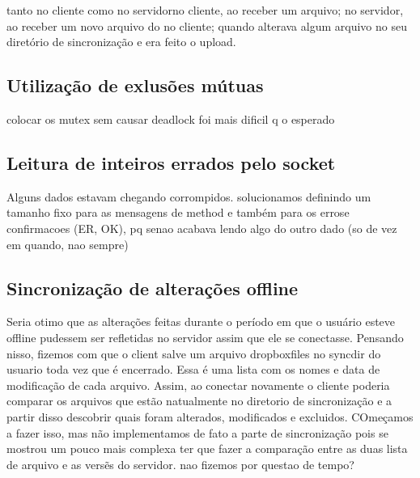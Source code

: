 \documentclass[a4paper]{article}
\begin{document}
tanto no cliente como no servidorno cliente, ao receber um arquivo; no servidor, ao receber um novo arquivo do  no cliente; quando alterava algum arquivo no seu diretório de sincronização e era feito o upload.
\subsection{Utilização de exlusões mútuas}
colocar os mutex sem causar deadlock foi mais dificil q o esperado

\subsection{Leitura de inteiros errados pelo socket}
Alguns dados estavam chegando corrompidos. solucionamos definindo um tamanho fixo para as mensagens de method e também para os errose confirmacoes (ER, OK), pq senao acabava lendo algo do outro dado (so de vez em quando, nao sempre)
 
\subsection{Sincronização de alterações offline}
Seria otimo que as alterações feitas durante o período em que o usuário esteve offline pudessem ser refletidas no servidor assim que ele se conectasse. Pensando nisso, fizemos com que o client salve um arquivo dropboxfiles no syncdir do usuario toda vez que é encerrado.
Essa é uma lista com os nomes e data de modificação de cada arquivo. Assim, ao conectar novamente o cliente poderia comparar os arquivos que estão natualmente no diretorio de sincronização e a partir disso descobrir quais foram alterados, modificados e excluidos. COmeçamos a fazer isso, mas não implementamos de fato a parte de sincronização pois se mostrou um pouco mais complexa ter que fazer a comparação entre as duas lista de arquivo e as versẽs do servidor. nao fizemos por questao de tempo?

%
%
\end{document}
